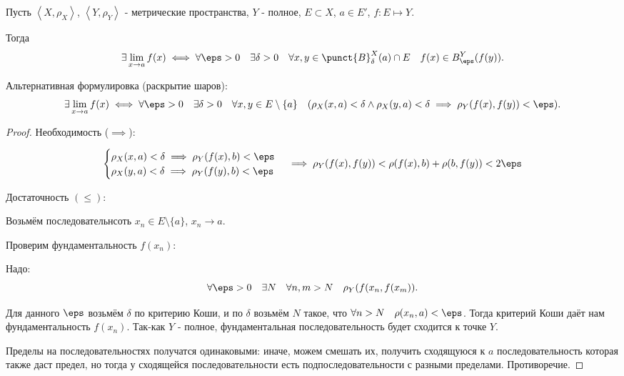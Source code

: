 \begin{theorem} \thmslashn

    
    Пусть $\left<X, \rho_{X}\right>$, $\left<Y, \rho_{Y}\right>$ - метрические пространства, $Y$ - полное, $E \subset X$, $a\in E'$, $f : E \mapsto Y$.
    
    Тогда
    \[ \exists\lim\limits_{x \to a} f(x) \iff \forall{\eps > 0}\quad \exists{\delta > 0}\quad \forall{x, y\in \punct{B}^{X}_{\delta}(a)\cap E}\quad f(x)\in B^{Y}_{\eps}(f(y))  . \]

    Альтернативная формулировка (раскрытие шаров):
    \[ \exists\lim\limits_{x \to a} f(x) \iff \forall{\eps > 0}\quad \exists{\delta > 0}\quad \forall{x, y\in E \setminus \{a\}}\quad (\rho_{X}(x, a) < \delta \land \rho_{X}(y, a) < \delta \implies \rho_{Y}(f(x), f(y)) < \eps) . \]
    \begin{proof} \thmslashn
    
        Необходимость ($\implies$):

        \begin{equation*}
            \begin{cases}
                \rho_{X}(x, a) < \delta \implies \rho_{Y}(f(x), b) < \eps\\
                \rho_{X}(y, a) < \delta \implies \rho_{Y}(f(y), b) < \eps
            \end{cases} \implies \rho_{Y}(f(x), f(y)) < \rho(f(x), b) + \rho(b, f(y)) < 2\eps
        \end{equation*}

        Достаточность $(\le)$:

        Возьмём последовательнсоть $x_{n}\in E \setminus \{a\}$, $x_{n} \to a$.

        Проверим фундаментальность $f(x_{n})$:

        Надо:
        \[ \forall{\eps > 0}\quad \exists{N}\quad \forall{n, m > N}\quad \rho_{Y}(f(x_{n}, f(x_{m})) .\]

        Для данного $\eps$ возьмём $\delta$ по критерию Коши, и по $\delta$ возьмём $N$ такое, что $\forall{n > N}\quad \rho(x_{n}, a) < \eps$. Тогда критерий Коши даёт нам фундаментальность $f(x_{n})$. Так-как $Y$ - полное, фундаментальная последовательность будет сходится к точке $Y$.

        Пределы на последовательностях получатся одинаковыми: иначе, можем смешать их, получить сходящуюся к $a$ последовательность которая также даст предел, но тогда у сходящейся последовательности есть подпоследовательности с разными пределами. Противоречие.
    \end{proof}
\end{theorem}

